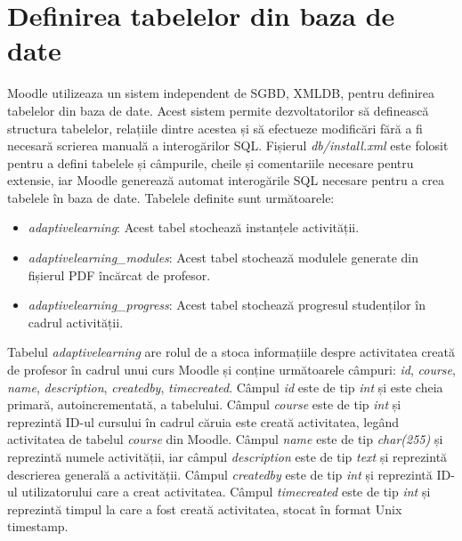 \section{Definirea tabelelor din baza de date}
Moodle utilizeaza un sistem independent de SGBD, XMLDB, pentru definirea tabelelor din baza de date. Acest sistem permite dezvoltatorilor să definească structura tabelelor, 
relațiile dintre acestea și să efectueze modificări fără a fi necesară scrierea manuală a interogărilor SQL. Fișierul \textit{db/install.xml} este folosit pentru a defini tabelele și 
câmpurile, cheile și comentariile necesare pentru extensie, iar Moodle generează automat interogările SQL necesare pentru a crea tabelele în baza de date. Tabelele definite sunt următoarele:
\begin{itemize}
    \item \textit{adaptivelearning}: Acest tabel stochează instanțele activității.
    \item \textit{adaptivelearning\_modules}: Acest tabel stochează modulele generate din fișierul PDF încărcat de profesor.
    \item \textit{adaptivelearning\_progress}: Acest tabel stochează progresul studenților în cadrul activității.
\end{itemize} 

Tabelul \textit{adaptivelearning} are rolul de a stoca informațiile despre activitatea creată de profesor în cadrul unui curs Moodle și conține următoarele câmpuri: \textit{id}, 
\textit{course}, \textit{name}, \textit{description}, \textit{createdby}, \textit{timecreated}. Câmpul \textit{id} este de tip \textit{int} și este cheia primară, autoincrementată,  a tabelului. 
Câmpul \textit{course} este de tip \textit{int} și reprezintă ID-ul cursului în cadrul căruia este creată activitatea, legând activitatea de tabelul \textit{course} din Moodle. Câmpul 
\textit{name} este de tip \textit{char(255)} și reprezintă numele activității, iar câmpul \textit{description} este de tip \textit{text} și reprezintă descrierea generală a activității. 
Câmpul \textit{createdby} este de tip \textit{int} și reprezintă ID-ul utilizatorului care a creat activitatea. Câmpul \textit{timecreated} este de tip \textit{int} și reprezintă timpul 
la care a fost creată activitatea, stocat în format Unix timestamp.

